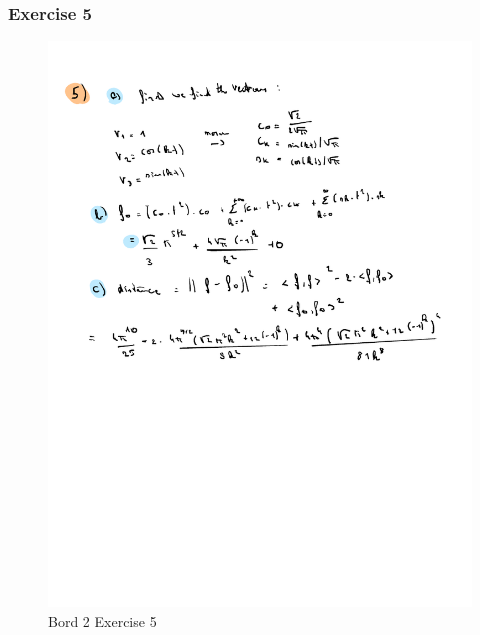 \documentclass[a4paper]{report}
\begin{document}
\subsubsection{Exercise 5}

\begin{figure}[H]
	\centering
	\includegraphics[width=\textwidth]{assets/bord_2_ex_5.pdf}
	\caption{Bord 2 Exercise 5}
	\label{fig:bord_2_ex_5}
\end{figure}
\end{document}
